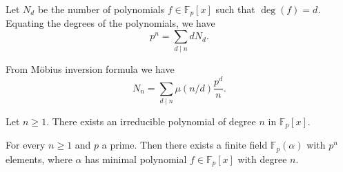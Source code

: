 \begin{corollary}
    Let \(N_d\) be the number of polynomials \(f \in \mathbb{F}_p[x]\) such that
    \(\deg(f) = d\). Equating the degrees of the polynomials, we have
    \[
        p^n = \sum_{d \mid n} d N_d.
    \]
\end{corollary}

\begin{corollary}
    From Möbius inversion formula we have
    \[
        N_n = \sum_{d \mid n} \mu(n/d) \frac{p^d}{n}.
    \]
\end{corollary}

\begin{corollary}
    Let \(n \geqslant  1\). There exists an irreducible polynomial of degree
    \(n\) in \(\mathbb{F}_p[x]\).
\end{corollary}

\begin{theorem}
    For every \(n \geqslant 1\) and \(p\) a prime. Then there exists a finite
    field \(\mathbb{F}_p(\alpha)\) with  \(p^n\) elements, where \(\alpha\) has
    minimal polynomial \(f \in \mathbb{F}_p[x]\) with degree \(n\).
\end{theorem}
